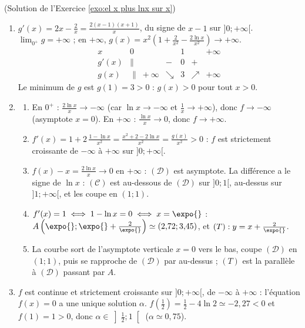 \begin{corrige}
\begin{sol} ~ \\
(Solution de l'Exercice \ref{exo:el x plus lnx sur x})
\begin{enumerate}
\item $g'(x) = 2x - \frac{2}{x} = \frac{2(x-1)(x+1)}{x}$, du signe de $x - 1$ sur $]0;+\infty[$.
      $\lim_{0^+} g = +\infty$ ; en $+\infty$, $g(x) = x^2\left(1 + \frac{2}{x^2} - \frac{2\ln x}{x^2}\right) \to +\infty$.
      \[
      \begin{array}{c|ccccc}
      x & 0 & & 1 & & +\infty \\ \hline
      g'(x) & \| & - & 0 & + & \\ \hline
      g(x) & \| \; +\infty & \searrow & 3 & \nearrow & +\infty
      \end{array}
      \]
      Le minimum de $g$ est $g(1) = 3 > 0$ : $g(x) > 0$ pour tout $x > 0$.
\item \begin{enumerate}
      \item En $0^+$ : $\frac{2\ln x}{x} \to -\infty$ (car $\ln x \to -\infty$ et $\frac{1}{x} \to +\infty$), donc $f \to -\infty$ (asymptote $x = 0$).
            En $+\infty$ : $\frac{\ln x}{x} \to 0$, donc $f \to +\infty$.
      \item $f'(x) = 1 + 2\,\frac{1 - \ln x}{x^2} = \frac{x^2 + 2 - 2\ln x}{x^2} = \frac{g(x)}{x^2} > 0$ :
            $f$ est strictement croissante de $-\infty$ \`a $+\infty$ sur $]0;+\infty[$.
      \item $f(x) - x = \frac{2\ln x}{x} \to 0$ en $+\infty$ : $(\mathcal{D})$ est asymptote. La diff\'erence a le signe de $\ln x$ :
            $(\mathscr{C})$ est au-dessous de $(\mathcal{D})$ sur $]0;1[$, au-dessus sur $]1;+\infty[$, et les coupe en $(1;1)$.
      \item $f'(x) = 1 \iff 1 - \ln x = 0 \iff x = \expo{}$ : $A\left(\expo{} ; \expo{} + \frac{2}{\expo{}}\right) \simeq (2{,}72 ; 3{,}45)$,
            et $(T) : y = x + \frac{2}{\expo{}}$.
      \item La courbe sort de l'asymptote verticale $x = 0$ vers le bas, coupe $(\mathcal{D})$ en $(1;1)$, puis se rapproche de $(\mathcal{D})$ par au-dessus ;
            $(T)$ est la parall\`ele \`a $(\mathcal{D})$ passant par $A$.
      \end{enumerate}
\item $f$ est continue et strictement croissante sur $]0;+\infty[$, de $-\infty$ \`a $+\infty$ : l'\'equation $f(x) = 0$ a une unique solution $\alpha$.
      $f\left(\frac{1}{2}\right) = \frac{1}{2} - 4\ln 2 \simeq -2{,}27 < 0$ et $f(1) = 1 > 0$, donc $\alpha \in \left]\frac{1}{2};1\right[$ ($\alpha \simeq 0{,}75$).
\end{enumerate}
\end{sol}


\end{corrige}
